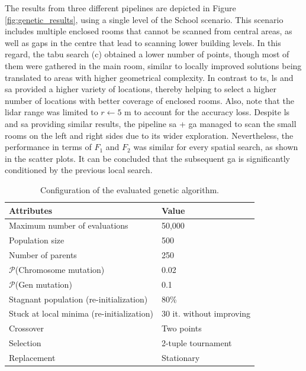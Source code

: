 The results from three different pipelines are depicted in Figure \ref{fig:genetic_results}, using a single level of the School scenario. This scenario includes multiple enclosed rooms that cannot be scanned from central areas, as well as gaps in the centre that lead to scanning lower building levels. In this regard, the tabu search (c) obtained a lower number of points, though most of them were gathered in the main room, similar to locally improved solutions being translated to areas with higher geometrical complexity. In contrast to \acrshort{ts}, \acrshort{ls} and \acrshort{sa} provided a higher variety of locations, thereby helping to select a higher number of locations with better coverage of enclosed rooms. Also, note that the \acrshort{lidar} range was limited to $r \gets 5$ \si{\meter} to account for the accuracy loss. Despite \acrshort{ls} and \acrshort{sa} providing similar results, the pipeline \acrshort{sa} + \acrshort{ga} managed to scan the small rooms on the left and right sides due to its wider exploration. Nevertheless, the performance in terms of $F_1$ and $F_2$ was similar for every spatial search, as shown in the scatter plots. It can be concluded that the subsequent \acrshort{ga} is significantly conditioned by the previous local search.

\renewcommand{\arraystretch}{1.15}
\begin{table}
\caption{Configuration of the evaluated genetic algorithm.}
\label{table:genetic_algorithm_parameters}
\begin{tabular}{ll}
\toprule
\textbf{Attributes} & \textbf{Value}\\
\midrule
Maximum number of evaluations & 50,000\\
Population size & 500\\
Number of parents & 250\\
$\mathcal{P}$(Chromosome mutation) & 0.02\\
$\mathcal{P}$(Gen mutation) & 0.1\\
Stagnant population (re-initialization) & 80\%\\
Stuck at local minima (re-initialization) & 30 it. without improving\\
Crossover & Two points\\
Selection & 2-tuple tournament\\
Replacement & Stationary\\
\bottomrule
\end{tabular}
\end{table}
\renewcommand{\arraystretch}{1}

